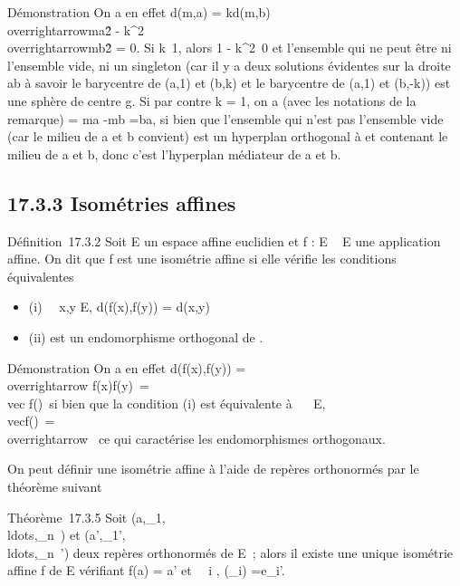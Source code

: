 \documentclass[]{article}
\begin{document}
Démonstration On a en effet d(m,a) = kd(m,b)
\Leftrightarrow
\\overrightarrowma\^2
-
k^2\\overrightarrowmb\^2
= 0. Si k\neq~1, alors 1 -
k^2\neq~0 et l'ensemble qui ne peut
être ni l'ensemble vide, ni un singleton (car il y a deux solutions
évidentes sur la droite ab à savoir le barycentre de (a,1) et (b,k) et
le barycentre de (a,1) et (b,-k)) est une sphère de centre g. Si par
contre k = 1, on a (avec les notations de la remarque)
\overrightarrowu =\overrightarrow
ma -\overrightarrow mb
=\overrightarrow ba, si bien que l'ensemble qui n'est
pas l'ensemble vide (car le milieu de a et b convient) est un hyperplan
orthogonal à \overrightarrowba et contenant le milieu
de a et b, donc c'est l'hyperplan médiateur de a et b.

\subsection{17.3.3 Isométries affines}

Définition~17.3.2 Soit E un espace affine euclidien et f : E \rightarrow~ E une
application affine. On dit que f est une isométrie affine si elle
vérifie les conditions équivalentes

\begin{itemize}
\itemsep1pt\parskip0pt
\item
  (i) \forall~~x,y \in E, d(f(x),f(y)) = d(x,y)
\item
  (ii) \vecf est un endomorphisme orthogonal de
  \overrightarrowE.
\end{itemize}

Démonstration On a en effet d(f(x),f(y))
=\\overrightarrow
f(x)f(y)\
=\\vec
f(\overrightarrowxy)\ si
bien que la condition (i) est équivalente à
\forall~\overrightarrow\xi~
\in\overrightarrow E,
\\vecf(\overrightarrow\xi)\
=\\overrightarrow
\xi\ ce qui caractérise les endomorphismes
orthogonaux.

On peut définir une isométrie affine à l'aide de repères orthonormés par
le théorème suivant

Théorème~17.3.5 Soit
(a,\vece_1,\\ldots,\vece_n~)
et
(a',\vece_1',\\ldots,\vece_n~')
deux repères orthonormés de E~; alors il existe une unique isométrie
affine f de E vérifiant f(a) = a' et \forall~~i \in
[1,n], \vecf(\vece_i)
=\vec e_i'.
\end{document}
